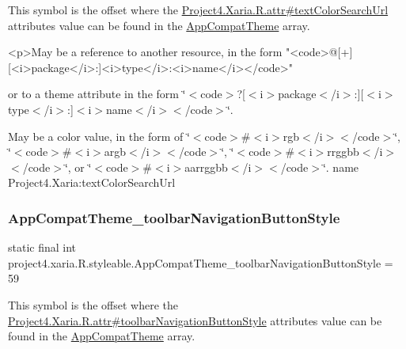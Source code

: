 This symbol is the offset where the \hyperlink{}{Project4.\+Xaria.\+R.\+attr\#text\+Color\+Search\+Url} attribute\textquotesingle{}s value can be found in the \hyperlink{classproject4_1_1xaria_1_1R_1_1styleable_aad8bec413e2350f9404e6ff0e831a85d}{App\+Compat\+Theme} array.

\begin{DoxyVerb}      <p>May be a reference to another resource, in the form "<code>@[+][<i>package</i>:]<i>type</i>:<i>name</i></code>"
\end{DoxyVerb}
 or to a theme attribute in the form \char`\"{}$<$code$>$?\mbox{[}$<$i$>$package$<$/i$>$\+:\mbox{]}\mbox{[}$<$i$>$type$<$/i$>$\+:\mbox{]}$<$i$>$name$<$/i$>$$<$/code$>$\char`\"{}. 

May be a color value, in the form of \char`\"{}$<$code$>$\#$<$i$>$rgb$<$/i$>$$<$/code$>$\char`\"{}, \char`\"{}$<$code$>$\#$<$i$>$argb$<$/i$>$$<$/code$>$\char`\"{}, \char`\"{}$<$code$>$\#$<$i$>$rrggbb$<$/i$>$$<$/code$>$\char`\"{}, or \char`\"{}$<$code$>$\#$<$i$>$aarrggbb$<$/i$>$$<$/code$>$\char`\"{}.  name Project4.\+Xaria\+:text\+Color\+Search\+Url \mbox{\label{classproject4_1_1xaria_1_1R_1_1styleable_ae547053c95c192e4f25178aa4530ee6a}} 
\subsubsection{\texorpdfstring{App\+Compat\+Theme\+\_\+toolbar\+Navigation\+Button\+Style}{AppCompatTheme\_toolbarNavigationButtonStyle}}
{\footnotesize\ttfamily static final int project4.\+xaria.\+R.\+styleable.\+App\+Compat\+Theme\+\_\+toolbar\+Navigation\+Button\+Style = 59\hspace{0.3cm}{\ttfamily [static]}}

This symbol is the offset where the \hyperlink{}{Project4.\+Xaria.\+R.\+attr\#toolbar\+Navigation\+Button\+Style} attribute\textquotesingle{}s value can be found in the \hyperlink{classproject4_1_1xaria_1_1R_1_1styleable_aad8bec413e2350f9404e6ff0e831a85d}{App\+Compat\+Theme} array.

